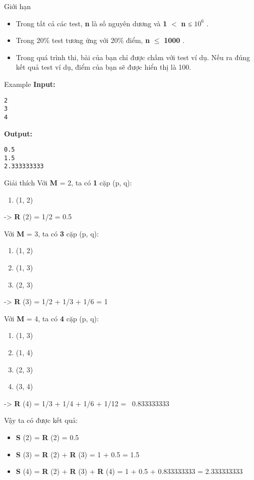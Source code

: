 Giới hạn
\begin{itemize}
	\item     Trong tất cả các test,    \textbf{     n    }    là số nguyên dương và    \textbf{     1    }    $<$    \textbf{     n    }    ≤    \textbf{     $10^{6}$}    .   
	\item     Trong 20\% test tương ứng với 20\% điểm,    \textbf{     n    }     $\le$     \textbf{     1000    }    .   
	\item     Trong quá trình thi, bài của bạn chỉ được chấm với test ví dụ. Nếu ra đúng kết quả test ví dụ, điểm của bạn sẽ được hiển thị là 100.   
\end{itemize}
Example
\textbf{    Input:   }
\begin{verbatim}
2
3
4
\end{verbatim}

\textbf{    Output:   }
\begin{verbatim}
0.5
1.5
2.333333333\end{verbatim}
Giải thích
Với   \textbf{    M   }   = 2, ta có   \textbf{    1   }   cặp (p, q):  
\begin{enumerate}
	\item     (1, 2)   
\end{enumerate}

   ->   \textbf{    R   }   (2) = 1/2 = 0.5  

   Với   \textbf{    M   }   = 3, ta có   \textbf{    3   }   cặp (p, q):  
\begin{enumerate}
	\item     (1, 2)   
	\item     (1, 3)   
	\item     (2, 3)   
\end{enumerate}

   ->   \textbf{    R   }   (3) = 1/2 + 1/3 + 1/6 = 1  

   Với   \textbf{    M   }   = 4, ta có   \textbf{    4   }   cặp (p, q):  
\begin{enumerate}
	\item     (1, 3)   
	\item     (1, 4)   
	\item     (2, 3)   
	\item     (3, 4)   
\end{enumerate}

   ->   \textbf{    R   }   (4) = 1/3 + 1/4 + 1/6 + 1/12 =  0.833333333  

   Vậy ta có được kết quả:  
\begin{itemize}
	\item \textbf{     S    }    (2) =    \textbf{     R    }    (2) = 0.5   
	\item \textbf{     S    }    (3) =    \textbf{     R    }    (2) +    \textbf{     R    }    (3) = 1 + 0.5 = 1.5   
	\item \textbf{     S    }    (4) =    \textbf{     R    }    (2) +    \textbf{     R    }    (3) +    \textbf{     R    }    (4) = 1 + 0.5 + 0.833333333 = 2.333333333   
\end{itemize}